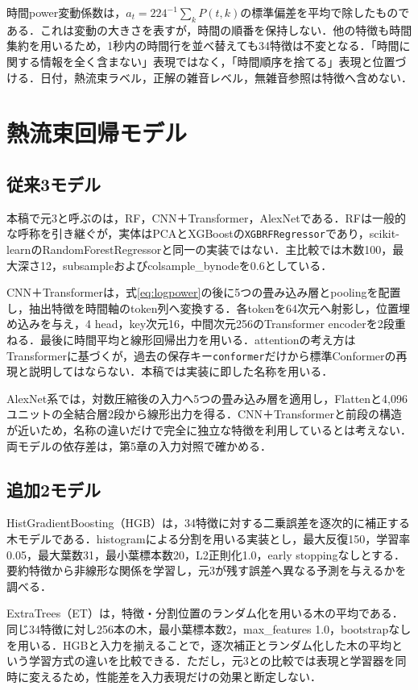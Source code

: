 時間power変動係数は，$a_t=224^{-1}\sum_kP(t,k)$の標準偏差を平均で除したものである．これは変動の大きさを表すが，時間の順番を保持しない．他の特徴も時間集約を用いるため，1秒内の時間行を並べ替えても34特徴は不変となる．「時間に関する情報を全く含まない」表現ではなく，「時間順序を捨てる」表現と位置づける．日付，熱流束ラベル，正解の雑音レベル，無雑音参照は特徴へ含めない．

\section{熱流束回帰モデル}
\subsection{従来3モデル}
本稿で元3と呼ぶのは，RF，CNN＋Transformer，AlexNetである．RFは一般的な呼称を引き継ぐが，実体はPCAとXGBoostの\texttt{XGBRFRegressor}\cite{xgbrf}であり，scikit-learnのRandomForestRegressorと同一の実装ではない．主比較では木数100，最大深さ12，subsampleおよびcolsample\_bynodeを0.6としている．

CNN＋Transformerは，式\eqref{eq:logpower}の後に5つの畳み込み層とpoolingを配置し，抽出特徴を時間軸のtoken列へ変換する．各tokenを64次元へ射影し，位置埋め込みを与え，4 head，key次元16，中間次元256のTransformer encoderを2段重ねる．最後に時間平均と線形回帰出力を用いる．attentionの考え方はTransformer\cite{vaswani2017}に基づくが，過去の保存キー\texttt{conformer}だけから標準Conformerの再現と説明してはならない．本稿では実装に即した名称を用いる．

AlexNet系\cite{krizhevsky2012}では，対数圧縮後の入力へ5つの畳み込み層を適用し，Flattenと4,096ユニットの全結合層2段から線形出力を得る．CNN＋Transformerと前段の構造が近いため，名称の違いだけで完全に独立な特徴を利用しているとは考えない．両モデルの依存差は，第5章の入力対照で確かめる．

\subsection{追加2モデル}
HistGradientBoosting（HGB）は，34特徴に対する二乗誤差を逐次的に補正する木モデルである．histogramによる分割を用いる実装\cite{sklearnHGB}とし，最大反復150，学習率0.05，最大葉数31，最小葉標本数20，L2正則化1.0，early stoppingなしとする．要約特徴から非線形な関係を学習し，元3が残す誤差へ異なる予測を与えるかを調べる．

ExtraTrees（ET）は，特徴・分割位置のランダム化を用いる木の平均\cite{geurts2006}である．同じ34特徴に対し256本の木，最小葉標本数2，max\_features 1.0，bootstrapなしを用いる．HGBと入力を揃えることで，逐次補正とランダム化した木の平均という学習方式の違いを比較できる．ただし，元3との比較では表現と学習器を同時に変えるため，性能差を入力表現だけの効果と断定しない．

